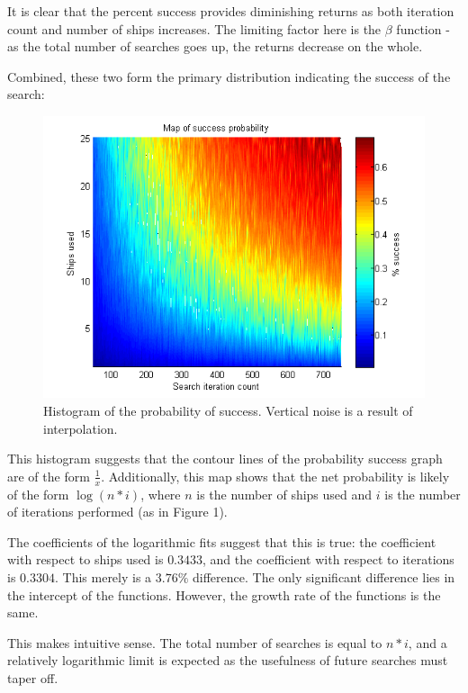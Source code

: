 \documentclass[a4paper]{article}
\begin{document}
It is clear that the percent success provides diminishing returns as both iteration count and number of ships increases. The limiting factor here is the $\beta$ function - as the total number of searches goes up, the returns decrease on the whole.

Combined, these two form the primary distribution indicating the success of the search:

\begin{figure}[H]\begin{center}
\includegraphics[scale=0.75]{../Matlab/Images/PctSuccessByItersShips.png}
\caption{Histogram of the probability of success. Vertical noise is a result of interpolation.}
\end{center}\end{figure}

This histogram suggests that the contour lines of the probability success graph are of the form $\frac 1x$. Additionally, this map shows that the net probability is likely of the form $\log(n*i)$, where $n$ is the number of ships used and $i$ is the number of iterations performed (as in Figure 1).

The coefficients of the logarithmic fits suggest that this is true: the coefficient with respect to ships used is $0.3433$, and the coefficient with respect to iterations is $0.3304$. This merely is a $3.76\%$ difference. The only significant difference lies in the intercept of the functions. However, the growth rate of the functions is the same.

This makes intuitive sense. The total number of searches is equal to $n*i$, and a relatively logarithmic limit is expected as the usefulness of future searches must taper off.
\end{document}
